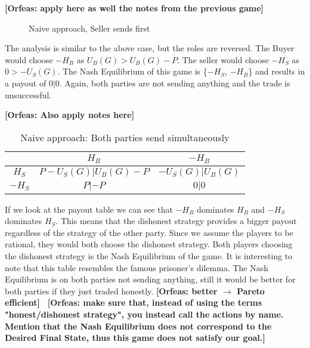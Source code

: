 \documentclass{cacthesis}
\newcommand{\authnote}[3]{{ \footnotesize \textbf{#1[#2: #3]~}}}
\newcommand{\orfnote}[1]{\authnote{\color{blue}}{Orfeas}{#1}}
\begin{document}
 \orfnote{apply here as well the notes
from the previous game}

\begin{figure}[htb!]
\newline
\caption{Naive approach, Seller sends first}
\end{figure}


The analysis is similar to the above case, but the roles are reversed. The Buyer would choose $-H_B$ as $U_B(G) > U_B(G)-P$.\newline
The seller would choose $-H_S$ as $0 > -U_S(G)$.\newline
The Nash Equilibrium of this game is \{$-H_S$, $-H_B$\} and results in a payout of $0|0$. Again, both parties are not sending anything and the trade is unsuccessful.

 \orfnote{Also apply notes
here}

\begin{table}[htb!]
    \centering
    \begin{tabular}{ c||c|c| }
    & $H_B$ & $-H_B$  \\
    \hline
    \hline
    $H_S$ & $P - U_S(G)|U_B(G) - P$ & $-U_S(G) | U_B(G)$ \\
    \hline
    $-H_S$ & $P |-P$ & $0 | 0$ \\ 
    \hline
    \end{tabular}
    \caption{Naive approach: Both parties send simultaneously}
\end{table}
If we look at the payout table we can see that $-H_B$ dominates $H_B$ and $-H_S$ dominates $H_S$. This means that the dishonest strategy provides a bigger payout regardless of the strategy of the other party. \newline
Since we assume the players to be rational, they would both choose the dishonest strategy. Both players choosing the dishonest strategy is the Nash Equilibrium of the game.\newline
It is interesting to note that this table resembles the famous prisoner's dilemma.
The Nash Equilibrium is on both parties not sending anything, still it would be
better for both parties if they just traded honestly. \orfnote{better
$\rightarrow$ Pareto efficient}
\orfnote{make sure that, instead of using the terms "honest/dishonest strategy",
you instead call the actions by name. Mention that the Nash Equilibrium does not
correspond to the Desired Final State, thus this game does not satisfy our goal.}
\end{document}
